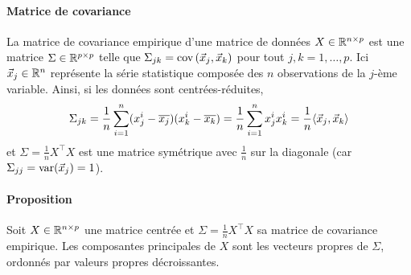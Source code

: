 \paragraph{Matrice de covariance} La matrice de covariance empirique d'une matrice de
données $X \in \mathbb{R}^{n \times p}$ est une matrice $\Sigma \in \mathbb{R}^{p \times p}$ telle que
$\Sigma_{jk} = \text{cov}\left(\xx_j, \xx_k \right)$ pour tout
$j, k = 1, \ldots, p$. Ici $\xx_j \in \RR^n$ représente la série statistique
composée des $n$ observations de la $j$-ème variable. Ainsi, si les données
sont centrées-réduites,
\[
  \Sigma_{jk} = \frac1n \sum_{i=1}^n (x_j^i - \overline{x_j})  (x_k^i - \overline{x_k}) = \frac1n \sum_{i=1}^n x_j^i x_k^i
   = \frac1n \langle \xx_j, \xx_k \rangle
 \]
 et $\Sigma = \frac1n X^\top X$ est une matrice symétrique avec $\frac1n$ sur la diagonale (car $\Sigma_{jj} = \text{var}(\xx_j) = 1$).

\paragraph{Proposition} 
Soit $X \in \mathbb{R}^{n \times p}$ une matrice centrée et 
$\Sigma = \frac1n X^\top X$ sa matrice de covariance empirique. Les composantes principales de $X$ sont les
vecteurs propres de $\Sigma$, ordonnés par valeurs propres décroissantes.

